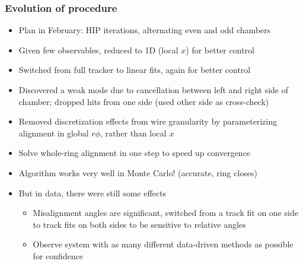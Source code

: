 \documentclass[compress]{beamer}
\begin{document}
\begin{frame}
\frametitle{Evolution of procedure}
\small
\begin{itemize}
  \item Plan in February: HIP iterations, alternating even and odd chambers
  \item Given few observables, reduced to 1D (local $x$) for better control
  \item Switched from full tracker to linear fits, again for better control
  \item Discovered a weak mode due to cancellation between left and
    right side of chamber; dropped hits from one side (used other side
    as cross-check)
  \item Removed discretization effects from wire granularity by
    parameterizing alignment in global $r\phi$, rather than local $x$
  \item Solve whole-ring alignment in one step to speed up convergence
  \item Algorithm works very well in Monte Carlo!  (accurate, ring closes)
  \item But in data, there were still some effects
\begin{itemize}
  \item Misalignment angles are significant, switched from a track fit
    on one side to track fits on both sides to be sensitive to
    relative angles
  \item Observe system with as many different data-driven methods as
    possible for confidence
\end{itemize}
\end{itemize}
\end{frame}
\end{document}
